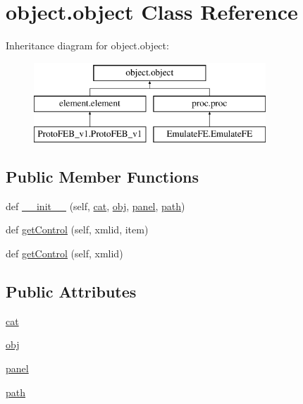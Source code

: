 \hypertarget{classobject_1_1object}{}\section{object.\+object Class Reference}
\label{classobject_1_1object}
Inheritance diagram for object.\+object\+:\begin{figure}[H]
\begin{center}
\leavevmode
\includegraphics[height=3.000000cm]{classobject_1_1object}
\end{center}
\end{figure}
\subsection*{Public Member Functions}
\begin{DoxyCompactItemize}
\item 
def \hyperlink{classobject_1_1object_aa3f4049602209943ac20eb5c307acb4b}{\+\_\+\+\_\+init\+\_\+\+\_\+} (self, \hyperlink{classobject_1_1object_af114388a80cca208c152ffeca0e89e23}{cat}, \hyperlink{classobject_1_1object_a82b61e7cd7e18b1f9de10fc832e5b75e}{obj}, \hyperlink{classobject_1_1object_af27de160eb6fbb9c6b3723bc4ebc8fb5}{panel}, \hyperlink{classobject_1_1object_a2a518f960961d791b0f900a90c3cd287}{path})
\item 
def \hyperlink{classobject_1_1object_a54a55487254a96ed2fe367439c41391f}{get\+Control} (self, xmlid, item)
\item 
def \hyperlink{classobject_1_1object_a22a9d1ff67cd6e990cf1b63ed49c50e4}{get\+Control} (self, xmlid)
\end{DoxyCompactItemize}
\subsection*{Public Attributes}
\begin{DoxyCompactItemize}
\item 
\hyperlink{classobject_1_1object_af114388a80cca208c152ffeca0e89e23}{cat}
\item 
\hyperlink{classobject_1_1object_a82b61e7cd7e18b1f9de10fc832e5b75e}{obj}
\item 
\hyperlink{classobject_1_1object_af27de160eb6fbb9c6b3723bc4ebc8fb5}{panel}
\item 
\hyperlink{classobject_1_1object_a2a518f960961d791b0f900a90c3cd287}{path}
\end{DoxyCompactItemize}


